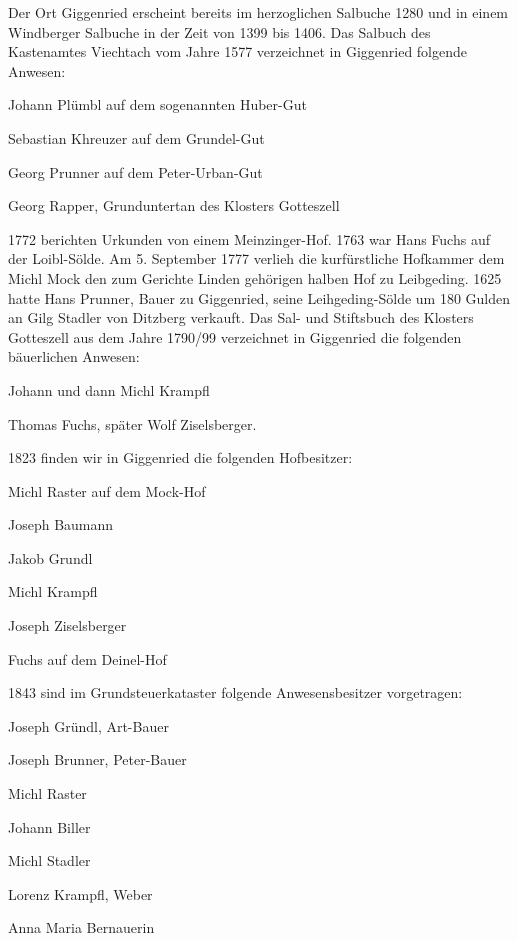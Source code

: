 \documentclass{book}
\begin{document}
Der Ort Giggenried erscheint bereits im herzoglichen Salbuche 1280 und in einem
Windberger Salbuche in der Zeit von 1399 bis 1406. Das Salbuch des Kastenamtes
Viechtach vom Jahre 1577 verzeichnet in Giggenried folgende Anwesen:



Johann Plümbl auf dem sogenannten Huber-Gut

Sebastian Khreuzer auf dem Grundel-Gut

Georg Prunner auf dem Peter-Urban-Gut

Georg Rapper, Grunduntertan des Klosters Gotteszell



1772 berichten Urkunden von einem Meinzinger-Hof. 1763 war Hans Fuchs auf der
Loibl-Sölde. Am 5. September 1777 verlieh die kurfürstliche Hofkammer dem Michl
Mock den zum Gerichte Linden gehörigen halben Hof zu Leibgeding. 1625 hatte Hans
Prunner, Bauer zu Giggenried, seine Leihgeding-Sölde um 180 Gulden an Gilg
Stadler von Ditzberg verkauft. Das Sal- und Stiftsbuch des Klosters Gotteszell
aus dem Jahre 1790/99 verzeichnet in Giggenried die folgenden bäuerlichen
Anwesen:



Johann und dann Michl Krampfl

Thomas Fuchs, später Wolf Ziselsberger.



1823 finden wir in Giggenried die folgenden Hofbesitzer:



Michl Raster auf dem Mock-Hof

Joseph Baumann

Jakob Grundl

Michl Krampfl

Joseph Ziselsberger

Fuchs auf dem Deinel-Hof



1843 sind im Grundsteuerkataster folgende Anwesensbesitzer vorgetragen:



Joseph Gründl, Art-Bauer

Joseph Brunner, Peter-Bauer

Michl Raster

Johann Biller

Michl Stadler

Lorenz Krampfl, Weber

Anna Maria Bernauerin
\end{document}

